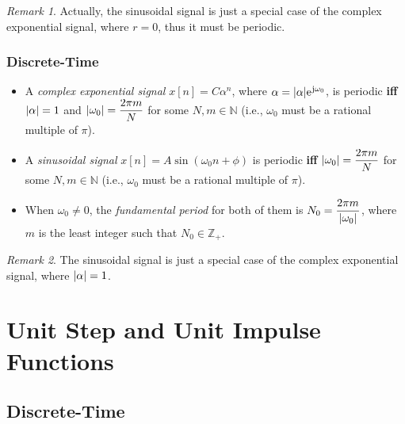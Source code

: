 \documentclass[10pt,UTF8]{article}
\newenvironment{definition box}
{\begin{tcolorbox}[colback=blue!5!white,colframe=blue!75!black,parbox=false,before upper=\par,before lower=\par]}
{\end{tcolorbox}}
\theoremstyle{definition}
\newtheorem*{definition inner}{Definition}
\theoremstyle{remark}
\newtheorem*{remark}{\textit{Remark}}
\newcommand{\ju}{\mathrm{j}}  %
\newcommand{\e}{\mathrm{e}{\mkern 1 mu}}
\begin{document}
\begin{remark}
    Actually, the sinusoidal signal is just a special case of the complex exponential signal,
    where $r = 0$, thus it must be periodic.
\end{remark}

\subsubsection{Discrete-Time}

\begin{itemize}
    \item A \emph{complex exponential signal} $x[n] = C \alpha^n$,
    where $\alpha = \abs{\alpha}\e^{\ju\omega_0}$, is periodic \textbf{iff}
    $\abs{\alpha} = 1$ and $\abs{\omega_0} = \dfrac{2\pi m}{N}$
    for some $N,m\in\mathbb{N}$
    (i.e., $\omega_0$ must be a rational multiple of $\pi$).
    \item A \emph{sinusoidal signal} $x[n] = A\sin(\omega_0 n+\phi)$
    is periodic \textbf{iff} $\abs{\omega_0} = \dfrac{2\pi m}{N}$
    for some $N,m\in\mathbb{N}$
    (i.e., $\omega_0$ must be a rational multiple of $\pi$).
    \item When $\omega_0 \ne 0$,
    the \emph{fundamental period} for both of them
    is $N_0=\dfrac{2\pi m}{\abs{\omega_0}}$,
    where $m$ is the least integer such that $N_0\in\mathbb{Z}_+$.
\end{itemize}

\begin{remark}
    The sinusoidal signal is just a special case of the complex exponential signal,
    where $\abs{\alpha} = 1$.
\end{remark}

\section{Unit Step and Unit Impulse Functions}

\subsection{Discrete-Time}
\end{document}
